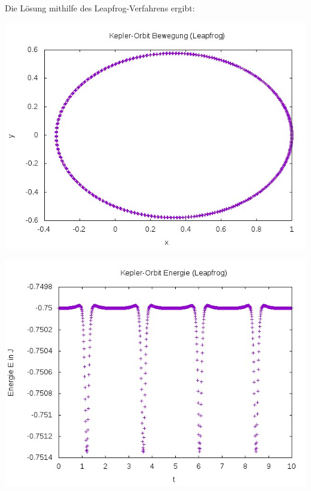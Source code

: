 \documentclass{scrreprt}
\begin{document}
Die Lösung mithilfe des Leapfrog-Verfahrens ergibt:
\begin{center}
	\includegraphics*[scale=0.7]{2_leapfrog_bewegung.jpeg}
\end{center}

\begin{center}
	\includegraphics*[scale=0.7]{2_leapfrog_energie.jpeg}
\end{center}
\end{document}

